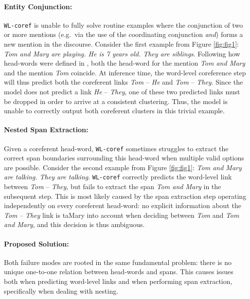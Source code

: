 \documentclass[11pt]{article}
\newcommand\wlcoref{{\texttt{WL-coref}}}
\begin{document}
\paragraph{Entity Conjunction:} \wlcoref{} is unable to fully solve routine examples where the conjunction of two or more mentions (e.g.~via the use of the coordinating conjunction \emph{and}) forms a new mention in the discourse. Consider the first example from Figure \ref{fig:fig1}: \emph{Tom and Mary are playing. He is 7 years old. They are siblings}. Following how head-words were defined in \citealt{dobrovolskii-2021-word}, both the head-word for the mention \emph{Tom and Mary} and the mention \emph{Tom} coincide. At inference time, the word-level coreference step will thus predict both the coreferent links \emph{Tom} -- \emph{He} and \emph{Tom} -- \emph{They}. Since the model does not predict a link \emph{He} -- \emph{They}, one of these two predicted links must be dropped in order to arrive at a consistent clustering. Thus, the model is unable to correctly output both coreferent clusters in this trivial example.

\paragraph{Nested Span Extraction:} Given a coreferent head-word, \wlcoref{} sometimes struggles to extract the correct span boundaries surrounding this head-word when multiple valid options are possible. Consider the second example from Figure \ref{fig:fig1}: \emph{Tom and Mary are talking. They are talking}. \wlcoref{} correctly predicts the word-level link between \emph{Tom} -- \emph{They}, but fails to extract the span \emph{Tom and Mary} in the subsequent step. This is most likely caused by the span extraction step operating independently on every coreferent head-word: no explicit information about the \emph{Tom} -- \emph{They} link is taMary into account when deciding between \emph{Tom} and \emph{Tom and Mary}, and this decision is thus ambiguous.

\paragraph{Proposed Solution:} Both failure modes are rooted in the same fundamental problem: there is no unique one-to-one relation between head-words and spans. This causes  issues both when predicting word-level links and when performing span extraction, specifically when dealing with nesting.
\end{document}
